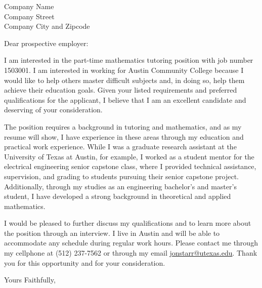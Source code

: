 \documentclass{letter}
\begin{document}
\begin{letter}{Company Name \\ Company Street \\ Company City and Zipcode}
\opening{Dear prospective employer:}

I am interested in the part-time mathematics tutoring position with job number 1503001.
I am interested in working for Austin Community College because
I would like to help others master difficult subjects and, in doing so,
help them achieve their education goals.
Given your listed requirements and preferred qualifications for the applicant,
I believe that I am an excellent candidate and deserving of your consideration.

The position requires a background in tutoring and mathematics, and as my resume will show,
I have experience in these areas through my education and practical work experience.
While I was a graduate research assistant at the University of Texas at Austin, for example,
I worked as a student mentor for the electrical engineering senior capstone class, where I provided
technical assistance,
supervision, and
grading
to students pursuing their senior capstone project.
Additionally, through my studies as an engineering bachelor's and master's student,
I have developed a strong background in theoretical and applied mathematics.

I would be pleased to further discuss my qualifications and to learn more about the position through an interview.
I live in Austin and will be able to accommodate any schedule during regular work hours.
Please contact me through my cellphone at (512) 237-7562 or through my email \vbox{\href{mailto:jonstarr@utexas.edu}{jonstarr@utexas.edu}.}
Thank you for this opportunity and for your consideration.

\closing{Yours Faithfully,}


\end{letter}
\end{document}
